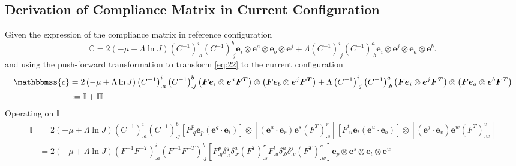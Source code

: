 \documentclass[../main.tex]{subfiles}
\begin{document}
\begin{appendices}
    \subsection{Derivation of Compliance Matrix in Current Configuration}
Given the expression of the compliance matrix in reference configuration
\begin{equation}\label{eq:22}
    \mathbb{C} = 2\left(-\mu + \Lambda\ln{J}\right)\left(C^{-1}\right)^i_{.a} \left(C^{-1}\right)^b_{.j} \boldsymbol{e}_{i} \otimes \boldsymbol{e}^{a} \otimes \boldsymbol{e}_{b} \otimes \boldsymbol{e}^{j}
    + \Lambda \left(C^{-1}\right)^i_{.j} \left(C^{-1}\right)^a_{.b} \boldsymbol{e}_{i} \otimes \boldsymbol{e}^{j} \otimes \boldsymbol{e}_{a} \otimes \boldsymbol{e}^{b}.
\end{equation}
and using the push-forward transformation to transform \eqref{eq:22} to the current configuration
\begin{equation}
    \begin{split}
    \mathbbmss{c} &= 2\left(-\mu + \Lambda\ln{J}\right)\left(C^{-1}\right)^i_{.a} \left(C^{-1}\right)^b_{.j} 
    \left(\boldsymbol{Fe}_i \otimes \boldsymbol{e}^a \boldsymbol{F^T}\right) \otimes \left(\boldsymbol{Fe}_b \otimes \boldsymbol{e}^j \boldsymbol{F^T}\right)
    + \Lambda \left(C^{-1}\right)^i_{.j} \left(C^{-1}\right)^a_{.b} 
    \left(\boldsymbol{Fe}_i \otimes \boldsymbol{e}^j \boldsymbol{F^T}\right) \otimes \left(\boldsymbol{Fe}_a \otimes \boldsymbol{e}^b \boldsymbol{F^T}\right)\\
    &:= \mathbb{I} + \mathbb{II}
    \end{split}
\end{equation}
Operating on $\mathbb{I}$
\begin{equation} \label{eq:I}
    \begin{split}
        \mathbb{I} &= 2\left(-\mu + \Lambda\ln{J}\right)\left(C^{-1}\right)^i_{.a} \left(C^{-1}\right)^b_{.j} \left[F^p_{.q} \boldsymbol{e}_p (\boldsymbol{e}^q \cdot \boldsymbol{e}_i)\right] \otimes \left[(\boldsymbol{e}^a \cdot \boldsymbol{e}_r) \boldsymbol{e}^s \left(F^T\right)^r_{.s}\right]
         \left[F^t_{.u} \boldsymbol{e}_t (\boldsymbol{e}^u \cdot \boldsymbol{e}_b)\right] \otimes \left[(\boldsymbol{e}^j \cdot \boldsymbol{e}_v) \boldsymbol{e}^w \left(F^T\right)^v_{.w} \right]\\
        &= 2\left(-\mu + \Lambda\ln{J}\right) \left(F^{-1}F^{-T}\right)^i_{.a} \left(F^{-1}F^{-T}\right)^b_{.j} \left[F^p_{.q} \delta^q_{.i} \delta^a_{.r} (F^T)^r_{.s}   F^t_{.u} \delta^u_{.b} \delta^j_{.v} (F^T)^v_{.w} \right] \boldsymbol{e}_p \otimes \boldsymbol{e}^s \otimes \boldsymbol{e}_t \otimes \boldsymbol{e}^w\\

\end{split}
\end{equation}
\end{appendices}
\end{document}
